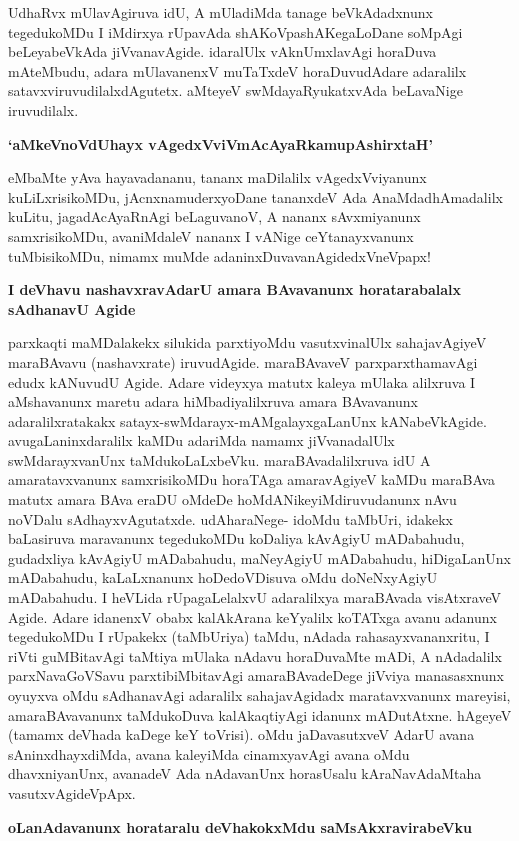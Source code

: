 UdhaRvx mUlavAgiruva idU, A mUladiMda tanage beVkAdadxnunx tegedukoMDu I iMdirxya rUpavAda shAKoVpashAKegaLoDane soMpAgi beLeyabeVkAda jiVvanavAgide. idaralUlx vAknUmxlavAgi horaDuva mAteMbudu, adara mUlavanenxV muTaTxdeV horaDuvudAdare adaralilx satavxviruvudilalxdAgutetx. aMteyeV swMdayaRyukatxvAda beLavaNige iruvudilalx.

{\bf `aMkeVnoVdUhayx vAgedxVviVmAcAyaRkamupAshirxtaH'}

eMbaMte yAva hayavadananu, tananx maDilalilx vAgedxVviyanunx kuLiLxrisikoMDu, jAcnxnamuderxyoDane tananxdeV Ada AnaMdadhAmadalilx kuLitu, jagadAcAyaRnAgi beLaguvanoV, A nananx sAvxmiyanunx samxrisikoMDu, avaniMdaleV nananx I vANige ceYtanayxvanunx tuMbisikoMDu, nimamx muMde adaninxDuvavanAgidedxVneVpapx!

{\bf I deVhavu nashavxravAdarU amara BAvavanunx horatarabalalx sAdhanavU Agide}

parxkaqti maMDalakekx silukida parxtiyoMdu vasutxvinalUlx sahajavAgiyeV maraBAvavu (nashavxrate) iruvudAgide. maraBAvaveV parxparxthamavAgi edudx kANuvudU Agide. Adare videyxya matutx kaleya mUlaka alilxruva I aMshavanunx maretu adara hiMbadiyalilxruva amara BAvavanunx adaralilxratakakx satayx-swMdarayx-mAMgalayxgaLanUnx kANabeVkAgide. avugaLaninxdaralilx kaMDu adariMda namamx jiVvanadalUlx swMdarayxvanUnx taMdukoLaLxbeVku. maraBAvadalilxruva idU A amaratavxvanunx samxrisikoMDu horaTAga amaravAgiyeV kaMDu maraBAva matutx amara BAva eraDU oMdeDe hoMdANikeyiMdiruvudanunx nAvu noVDalu sAdhayxvAgutatxde. udAharaNege- idoMdu taMbUri, idakekx baLasiruva maravanunx tegedukoMDu koDaliya kAvAgiyU mADabahudu, gudadxliya kAvAgiyU mADabahudu, maNeyAgiyU mADabahudu, hiDigaLanUnx mADabahudu, kaLaLxnanunx hoDedoVDisuva oMdu doNeNxyAgiyU mADabahudu. I heVLida rUpagaLelalxvU adaralilxya maraBAvada visAtxraveV Agide. Adare idanenxV obabx kalAkArana keYyalilx koTATxga avanu adanunx tegedukoMDu I rUpakekx (taMbUriya) taMdu, nAdada rahasayxvananxritu, I riVti guMBitavAgi taMtiya mUlaka nAdavu horaDuvaMte mADi, A nAdadalilx parxNavaGoVSavu parxtibiMbitavAgi amaraBAvadeDege jiVviya manasasxnunx oyuyxva oMdu sAdhanavAgi adaralilx sahajavAgidadx maratavxvanunx mareyisi, amaraBAvavanunx taMdukoDuva kalAkaqtiyAgi idanunx mADutAtxne. hAgeyeV (tamamx deVhada kaDege keY toVrisi). oMdu jaDavasutxveV AdarU avana sAninxdhayxdiMda, avana kaleyiMda cinamxyavAgi avana oMdu dhavxniyanUnx, avanadeV Ada nAdavanUnx horasUsalu kAraNavAdaMtaha vasutxvAgideVpApx.

{\bf oLanAdavanunx horataralu deVhakokxMdu saMsAkxravirabeVku}

